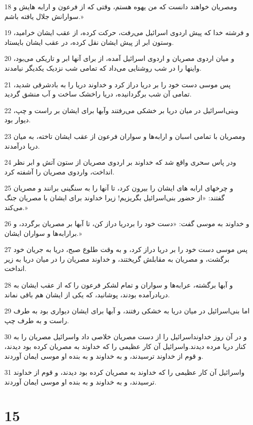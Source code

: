\par 18 ومصریان خواهند دانست که من یهوه هستم، وقتی که از فرعون و ارابه هایش و سوارانش جلال یافته باشم.»
\par 19 و فرشته خدا که پیش اردوی اسرائیل می‌رفت، حرکت کرده، از عقب ایشان خرامید، وستون ابر از پیش ایشان نقل کرده، در عقب ایشان بایستاد.
\par 20 و میان اردوی مصریان و اردوی اسرائیل آمده، از برای آنها ابر و تاریکی می‌بود، واینها را در شب روشنایی می‌داد که تمامی شب نزدیک یکدیگر نیامدند.
\par 21 پس موسی دست خود را بر دریا دراز کرد و خداوند دریا را به بادشرقی شدید، تمامی آن شب برگردانیده، دریا راخشک ساخت و آب منشق گردید.
\par 22 وبنی‌اسرائیل در میان دریا بر خشکی می‌رفتند وآبها برای ایشان بر راست و چپ، دیوار بود.
\par 23 ومصریان با تمامی اسبان و ارابه‌ها و سواران فرعون از عقب ایشان تاخته، به میان دریا درآمدند.
\par 24 ودر پاس سحری واقع شد که خداوند بر اردوی مصریان از ستون آتش و ابر نظر انداخت، واردوی مصریان را آشفته کرد.
\par 25 و چرخهای ارابه های ایشان را بیرون کرد، تا آنها را به سنگینی برانند و مصریان گفتند: «از حضور بنی‌اسرائیل بگریزیم! زیرا خداوند برای ایشان با مصریان جنگ می‌کند.»
\par 26 و خداوند به موسی گفت: «دست خود را بردریا دراز کن، تا آبها بر مصریان برگردد، و برارابه‌ها و سواران ایشان.»
\par 27 پس موسی دست خود را بر دریا دراز کرد، و به وقت طلوع صبح، دریا به جریان خود برگشت، و مصریان به مقابلش گریختند، و خداوند مصریان را در میان دریا به زیر انداخت.
\par 28 و آبها برگشته، عرابه‌ها و سواران و تمام لشکر فرعون را که از عقب ایشان به دریادرآمده بودند، پوشانید، که یکی از ایشان هم باقی نماند.
\par 29 اما بنی‌اسرائیل در میان دریا به خشکی رفتند، و آبها برای ایشان دیواری بود به طرف راست و به طرف چپ.
\par 30 و در آن روز خداونداسرائیل را از دست مصریان خلاصی داد واسرائیل مصریان را به کنار دریا مرده دیدند.واسرائیل آن کار عظیمی را که خداوند به مصریان کرده بود دیدند، و قوم از خداوند ترسیدند، و به خداوند و به بنده او موسی ایمان آوردند.
\par 31 واسرائیل آن کار عظیمی را که خداوند به مصریان کرده بود دیدند، و قوم از خداوند ترسیدند، و به خداوند و به بنده او موسی ایمان آوردند.
 
\chapter{15}

